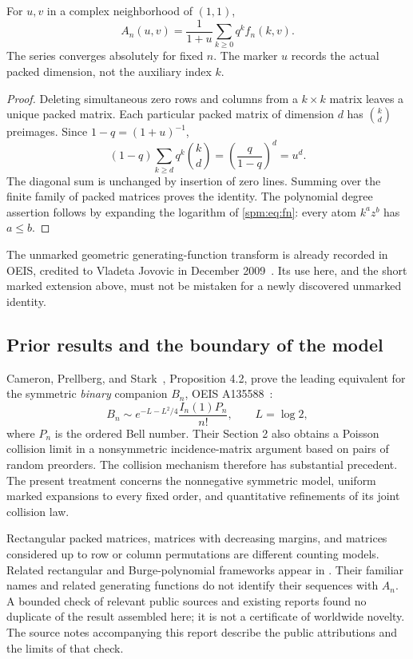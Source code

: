\begin{proposition}\label{spm:prop:transform}
For $u,v$ in a complex neighborhood of $(1,1)$,
\begin{equation}\label{spm:eq:transform}
 A_n(u,v)=\frac1{1+u}\sum_{k\geq0}q^k f_n(k,v).
\end{equation}
The series converges absolutely for fixed $n$. The marker $u$ records the actual packed dimension, not the auxiliary index $k$.
\end{proposition}
\begin{proof}
Deleting simultaneous zero rows and columns from a $k\times k$ matrix leaves a unique packed matrix. Each particular packed matrix of dimension $d$ has $\binom{k}{d}$ preimages. Since $1-q=(1+u)^{-1}$,
\[
 (1-q)\sum_{k\geq d}q^k\binom{k}{d}
 =\left(\frac{q}{1-q}\right)^d=u^d.
\]
The diagonal sum is unchanged by insertion of zero lines. Summing over the finite family of packed matrices proves the identity. The polynomial degree assertion follows by expanding the logarithm of \eqref{spm:eq:fn}: every atom $k^a z^b$ has $a\leq b$.
\end{proof}

The unmarked geometric generating-function transform is already recorded in OEIS, credited to Vladeta Jovovic in December 2009~\cite{oeis138178}. Its use here, and the short marked extension above, must not be mistaken for a newly discovered unmarked identity.

\subsection{Prior results and the boundary of the model}
Cameron, Prellberg, and Stark~\cite{cps}, Proposition 4.2, prove the leading equivalent for the symmetric \emph{binary} companion $B_n$, OEIS A135588~\cite{oeis135588}:
\begin{equation}\label{spm:eq:priorbinary}
 B_n\sim e^{-L-L^2/4}\frac{I_n(1)P_n}{n!},\qquad L=\log2,
\end{equation}
where $P_n$ is the ordered Bell number. Their Section 2 also obtains a Poisson collision limit in a nonsymmetric incidence-matrix argument based on pairs of random preorders. The collision mechanism therefore has substantial precedent. The present treatment concerns the nonnegative symmetric model, uniform marked expansions to every fixed order, and quantitative refinements of its joint collision law.

Rectangular packed matrices, matrices with decreasing margins, and matrices considered up to row or column permutations are different counting models. Related rectangular and Burge-polynomial frameworks appear in \cite{matrixcomp,caylerian}. Their familiar names and related generating functions do not identify their sequences with $A_n$. A bounded check of relevant public sources and existing reports found no duplicate of the result assembled here; it is not a certificate of worldwide novelty. The source notes accompanying this report describe the public attributions and the limits of that check.


